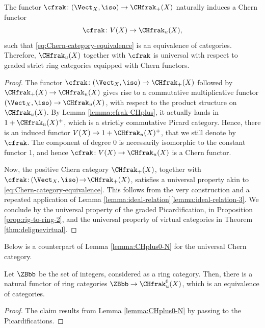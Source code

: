 \begin{theorem}\label{thm:CH-is-universal}
The functor $\cfrak\colon (\Vect_{X},\iso)\to \CHfrak_{+}(X)$ naturally induces a Chern functor
\begin{displaymath}
\cfrak\colon V(X)\to\CHfrak_{u}(X),
\end{displaymath} such that \eqref{eq:Chern-category-equivalence} is an equivalence of categories. Therefore, $\CHfrak_{u}(X)$ together with $\cfrak$ is universal with respect to graded strict ring categories equipped with Chern functors.
\end{theorem}
\begin{proof}
The functor $\cfrak\colon (\Vect_{X},\iso)\to \CHfrak_{+}(X)$ followed by $\CHfrak_{+}(X)\to\CHfrak_{u}(X)$ gives rise to a commutative multiplicative functor $ (\Vect_{X},\iso)\to \CHfrak_{u}(X)$, with respect to the product structure on $\CHfrak_{u}(X)$. By Lemma \ref{lemma:cfrak-CHplus}, it actually lands in $1+\CHfrak_{u}(X)^{+}$, which is a strictly commutative Picard category. Hence, there is an induced functor $V(X)\to 1+\CHfrak_{u}(X)^{+}$, that we still denote by $\cfrak$. The component of degree 0 is necessarily isomorphic to the constant functor 1, and hence $\cfrak\colon V(X)\to\CHfrak_{u}(X)$ is a Chern functor.

Now, the positive Chern category $\CHfrak_{+}(X)$, together with \hbox{$\cfrak\colon\! (\Vect_{X},\iso)\!\to\!\CHfrak_{+}(X)$}, satisfies a universal property akin to \eqref{eq:Chern-category-equivalence}. This follows from the very construction and a repeated application of Lemma \ref{lemma:ideal-relation}\eqref{lemma:ideal-relation-3}. We conclude by the universal property of the graded Picardification, in Proposition \ref{prop:rig-to-ring-2}, and the universal property of virtual categories in Theorem \ref{thm:delignevirtual}.
\end{proof}

Below is a counterpart of Lemma \ref{lemma:CHplus0-N} for the universal Chern category.
\begin{lemma}\label{lemma:CHu0-Z}
Let $\ZBbb$ be the set of integers, considered as a ring category. Then, there is a natural functor of ring categories $\ZBbb\to\CHfrak_{u}^{0}(X)$, which is an equivalence of categories.
\end{lemma}
\begin{proof}
The claim results from Lemma \ref{lemma:CHplus0-N} by passing to the Picardifications.
\end{proof}

